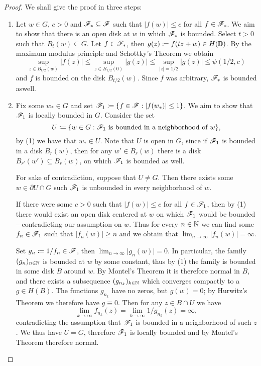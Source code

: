 \begin{proof}
    We shall give the proof in three steps:
    \begin{enumerate}
        \item Let $w \in G$, $c > 0$ and $\mathscr{F}_* \subseteq \mathscr{F}$ such that $\vert f(w) \vert \leq c$ for all $f \in \mathscr{F}_*$. We aim to show that there is an open disk at $w$ in which $\mathscr{F}_*$ is bounded. Select $t > 0$ such that $B_t(w) \subseteq G$. Let $f \in \mathscr{F}_*$, then $g(z) \coloneqq f(tz + w) \in H(\mathbb{D})$. By the maximum modulus principle and Schottky's Theorem we obtain
        $$ \sup_{z \in B_{t/2}(w)} \vert f(z) \vert \leq \sup_{z \in B_{1/2}(0)} \vert g(z) \vert \leq \sup_{\vert z \vert = 1/2} \vert g(z) \vert \leq \psi(1/2, c) $$
        and $f$ is bounded on the disk $B_{t/2}(w)$. Since $f$ was arbitrary, $\mathscr{F}_*$ is bounded aswell.

        \item Fix some $w_* \in G$ and set $\mathscr{F}_1 \coloneqq \{ f \in \mathscr{F} : \vert f(w_*) \vert \leq 1 \}$. We aim to show that $\mathscr{F}_1$ is locally bounded in $G$. Consider the set
        $$ U \coloneqq \{ w \in G : \mathscr{F}_1 \textrm{ is bounded in a neighborhood of } w \}, $$
        by (1) we have that $w_* \in U$. Note that $U$ is open in $G$, since if $\mathscr{F}_1$ is bounded in a disk $B_r(w)$, then for any $w' \in B_r(w)$ there is a disk $B_{r'}(w') \subseteq B_r(w)$, on which $\mathscr{F}_1$ is bounded as well.
        
        For sake of contradiction, suppose that $U \neq G$. Then there exists some $w \in \partial U \cap G$ such $\mathscr{F}_1$ is unbounded in every neighborhood of $w$.

        If there were some $c > 0$ such that $\vert f(w) \vert \leq c$ for all $f \in \mathscr{F}_1$, then by (1) there would exist an open disk centered at $w$ on which $\mathscr{F}_1$ would be bounded -- contradicting our assumption on $w$. Thus for every $n \in \mathbb{N}$ we can find some $f_n \in \mathscr{F}_1$ such that $\vert f_n(w) \vert \geq n$ and we obtain that $\lim_{n \to \infty} \vert f_n(w) \vert = \infty$.
        
        Set $g_n \coloneqq 1 / f_n \in \mathscr{F}$, then $\lim_{n \to \infty} \vert g_n(w) \vert = 0$. In particular, the family $(g_n)_{n \in \mathbb{N}}$ is bounded at $w$ by some constant, thus by (1) the family is bounded in some disk $B$ around $w$. By Montel's Theorem it is therefore normal in $B$, and there exists a subsequence $(g_{n_k})_{k \in \mathbb{N}}$ which converges compactly to a $g \in H(B)$. The functions $g_{n_k}$ have no zeros, but $g(w) = 0$; by Hurwitz's Theorem we therefore have $g \equiv 0$. Then for any $z \in B \cap U$ we have
        $$ \lim_{k \to \infty} f_{n_k}(z) = \lim_{k \to \infty} 1 / g_{n_k}(z) = \infty, $$
        contradicting the assumption that $\mathscr{F}_1$ is bounded in a neighborhood of such $z$. We thus have $U = G$, therefore $\mathscr{F}_1$ is locally bounded and by Montel's Theorem therefore normal.


\end{enumerate}
\end{proof}
